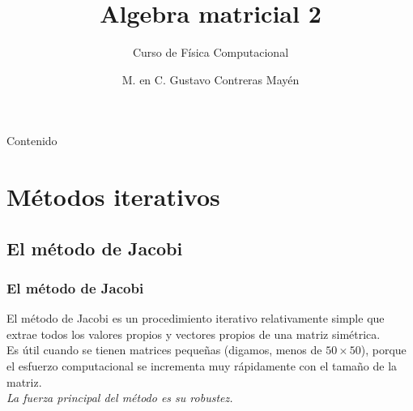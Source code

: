 


\normalfont
\usepackage{ccfonts}%
\usepackage[T1]{fontenc}%
\renewcommand{\rmdefault}{cmr}%
\linespread{1.3}
\title{Algebra matricial 2}
\subtitle{Curso de Física Computacional}
\author[]{M. en C. Gustavo Contreras Mayén}
\newcommand{\seti}{\setcounter{saveenumi}{\value{enumi}}}
\newcommand{\conti}{\setcounter{enumi}{\value{saveenumi}}}


\newcommand{\localtextbulletone}{\textcolor{gray}{\raisebox{.45ex}{\rule{.6ex}{.6ex}}}}
\maketitle
\fontsize{14}{14}\selectfont
{}
\begin{frame}{Contenido}
\tableofcontents[pausesections]
\end{frame}
\section{Métodos iterativos}
\subsection{El método de Jacobi}
\begin{frame}
\frametitle{El método de Jacobi}
El método de Jacobi es un procedimiento iterativo relativamente simple que extrae todos los valores propios y vectores propios de una matriz simétrica.
\\
\bigskip
Es útil cuando se tienen matrices pequeñas (digamos, menos de $50 \times 50$), porque el esfuerzo computacional se incrementa muy rápidamente con el tamaño de la matriz.
\\
\medskip
\emph{La fuerza principal del método es su robustez.}
\end{frame}
